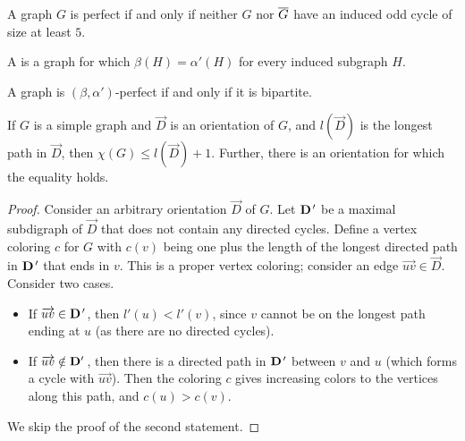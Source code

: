 \begin{theorem}
  A graph $G$ is perfect if and only if neither $G$ nor $\overline{G}$ have an induced
  odd cycle of size at least $5$.
\end{theorem}

\begin{definition}
  A  is a graph for which $\beta(H) =
  \alpha'(H)$ for every induced subgraph $H$.
\end{definition}

\begin{theorem}
  A graph is $(\beta, \alpha')$-perfect if and only if it is bipartite.
\end{theorem}


\begin{theorem}
  If $G$ is a simple graph and $\vec{D}$ is an orientation of $G$, and
  $l(\vec{D})$ is the longest path in $\vec{D}$, then $\chi(G) \le l(\vec{D}) +
  1$.
  Further, there is an orientation for which the equality holds.
\end{theorem}

\begin{proof}
  Consider an arbitrary orientation $\vec{D}$ of $G$.
  Let $\pvec{D}'$ be a maximal subdigraph of $\vec{D}$ that does not contain any
  directed cycles.
  Define a vertex coloring $c$ for $G$ with $c(v)$ being one plus the length of
  the longest directed path in $\pvec{D}'$ that ends in $v$.
  This is a proper vertex coloring; consider an edge $\overrightarrow{uv} \in
  \vec{D}$.
  Consider two cases.
  \begin{itemize}
  \item If $\overrightarrow{uv} \in \pvec{D}'$, then $l'(u) < l'(v)$, since $v$
	cannot be on the longest path ending at $u$ (as there are no directed cycles).
  \item If $\overrightarrow{uv} \notin \pvec{D'}$, then there is a directed path
	in $\pvec{D}'$ between $v$ and $u$ (which forms a cycle with
	$\overrightarrow{uv}$).
	Then the coloring $c$ gives increasing colors to the vertices along this
	path, and $c(u) > c(v)$.
  \end{itemize}
  We skip the proof of the second statement.
\end{proof}

